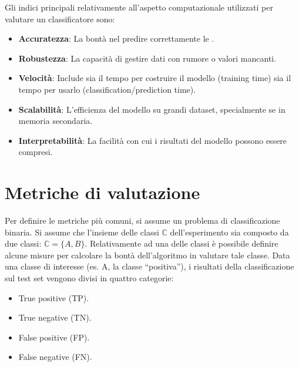 Gli indici principali relativamente all'aspetto computazionale utilizzati
per valutare un classificatore sono:
\begin{itemize}
    \item \textbf{Accuratezza}: La bontà nel predire correttamente le
    .
    \item \textbf{Robustezza}: La capacità di gestire dati con rumore o valori
    mancanti.
    \item \textbf{Velocità}: Include sia il tempo per costruire il modello
    (training time) sia il tempo per usarlo (classification/prediction time).
    \item \textbf{Scalabilità}: L'efficienza del modello su grandi dataset,
    specialmente se in memoria secondaria.
    \item \textbf{Interpretabilità}: La facilità con cui i risultati del
    modello possono essere compresi.
\end{itemize}

\section{Metriche di valutazione}
Per definire le metriche più comuni, si assume un problema di classificazione
binaria. Si assume che l'insieme delle classi $\mathbb{C}$ dell'esperimento
sia composto da due classi: $\mathbb{C}=\{A,B\}$.
Relativamente ad una delle classi è possibile definire alcune misure per
calcolare la bontà dell'algoritmo in valutare tale classe.
Data una classe di interesse (es. A, la classe ``positiva''),
i risultati della classificazione sul test set vengono divisi in quattro
categorie:

\begin{itemize}
    \item True positive (TP).
    \item True negative (TN).
    \item False positive (FP).
    \item False negative (FN).
\end{itemize}

